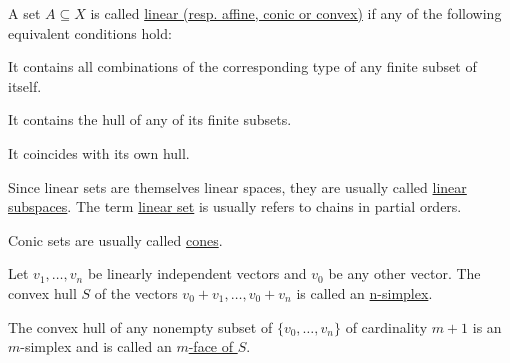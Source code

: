 \begin{definition}\label{def:linear_combination_sets}
  A set $A \subseteq X$ is called \uline{linear (resp. affine, conic or convex)} if any of the following equivalent conditions hold:

  \begin{defenum}
    \item It contains all combinations of the corresponding type of any finite subset of itself.
    \item It contains the hull of any of its finite subsets.
    \item It coincides with its own hull.
  \end{defenum}

  Since linear sets are themselves linear spaces, they are usually called \uline{linear subspaces}. The term \uline{linear set} is usually refers to chains in partial orders.

  Conic sets are usually called \uline{cones}.
\end{definition}

\begin{definition}\label{def:simplex}
  Let $v_1, \ldots, v_n$ be linearly independent vectors and $v_0$ be any other vector. The convex hull $S$ of the vectors $v_0 + v_1, \ldots, v_0 + v_n$ is called an \uline{n-simplex}.

  The convex hull of any nonempty subset of $\{ v_0, \ldots, v_n \}$ of cardinality $m + 1$ is an $m$-simplex and is called an \uline{$m$-face of $S$}.
\end{definition}
